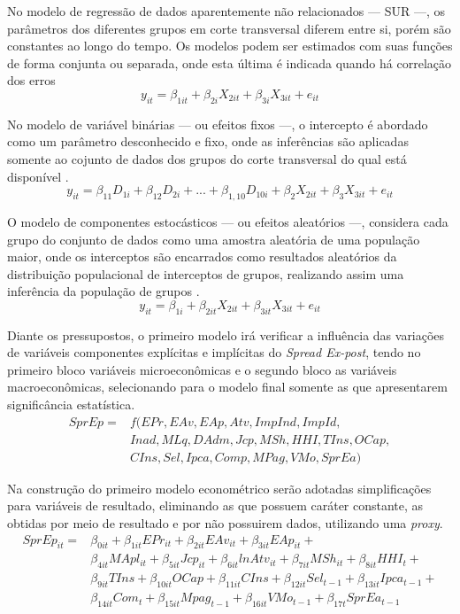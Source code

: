 \documentclass[12pt,12pt,openright,oneside,a4paper,chapter=TITLE,section=TITLE,subsection=TITLE,subsubsection=TITLE,english,french,spanish,portugues,sumario=tradicional]{abntex2}
\begin{document}
No modelo de regressão de dados aparentemente não relacionados --- SUR ---, os parâmetros dos diferentes grupos em corte transversal diferem entre si, porém são constantes ao longo do tempo. Os modelos podem ser estimados com suas funções de forma conjunta ou separada, onde esta última é indicada quando há correlação dos erros \cite{hill:2010}
\[
y_{it} = \beta_{1it} + \beta_{2i}X_{2it} + \beta_{3i}X_{3it} + e_{it}
\]

No modelo de variável binárias --- ou efeitos fixos ---, o intercepto é abordado como um parâmetro desconhecido e fixo, onde as inferências são aplicadas somente ao cojunto de dados dos grupos do corte transversal do qual está disponível \cite{hill:2010}.
\[
y_{it} = \beta_{11}D_{1i} + \beta_{12}D_{2i} + ... + \beta_{1,10}D_{10i} + \beta_{2}X_{2it} + \beta_{3}X_{3it} + e_{it}
\]

O modelo de componentes estocásticos --- ou efeitos aleatórios ---, considera cada grupo do conjunto de dados como uma amostra aleatória de uma população maior, onde os interceptos são encarrados como resultados aleatórios da distribuição populacional de interceptos de grupos, realizando assim uma inferência da população de grupos \cite{hill:2010}.
\[
y_{it} = \beta_{1i} + \beta_{2it}X_{2it} + \beta_{3it}X_{3it} + e_{it}
\]

Diante os pressupostos, o primeiro modelo irá verificar a influência das variações de variáveis componentes explícitas e implícitas do \emph{Spread Ex-post}, tendo no primeiro bloco variáveis microeconômicas e o segundo bloco as variáveis macroeconômicas, selecionando para o modelo final somente as que apresentarem significância estatística.
\[\begin{aligned}
SprEp = &f(EPr, EAv, EAp, Atv, ImpInd, ImpId, \\ 
& Inad, MLq, DAdm, Jcp, MSh, HHI, TIns, OCap, \\ 
& CIns, Sel, Ipca, Comp, MPag, VMo, SprEa)
\end{aligned}\]

Na construção do primeiro modelo econométrico serão adotadas simplificações para variáveis de resultado, eliminando as que possuem caráter constante, as obtidas por meio de resultado e por não possuirem dados, utilizando uma \emph{proxy}.
\[\begin{aligned}
SprEp_{it} = & \beta_{0it} + \beta_{1it}EPr_{it} + \beta_{2it}EAv_{it} + \beta_{3it}EAp_{it} + \\
&\beta_{4it}MApl_{it} + \beta_{5it}Jcp_{it}  + \beta_{6it}lnAtv_{it} + \beta_{7it}MSh_{it}  + \beta_{8it}HHI_{t} + \\
& \beta_{9it}TIns + \beta_{10it}OCap + \beta_{11it}CIns + \beta_{12it}Sel_{t-1} + \beta_{13it}Ipca_{t-1} + \\
& \beta_{14it}Com_{t} + \beta_{15it}Mpag_{t-1} + \beta_{16it}VMo_{t-1} +  \beta_{17t}SprEa_{t-1}
\end{aligned}\]
\end{document}
